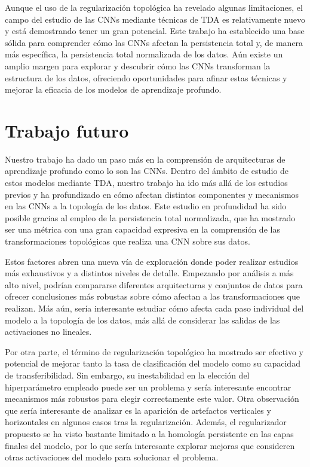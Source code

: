 Aunque el uso de la regularización topológica ha revelado algunas limitaciones,
el campo del estudio de las CNNs mediante técnicas de TDA es relativamente nuevo
y está demostrando tener un gran potencial. Este trabajo ha establecido una base
sólida para comprender cómo las CNNs afectan la persistencia total y, de manera
más específica, la persistencia total normalizada de los datos. Aún existe un
amplio margen para explorar y descubrir cómo las CNNs transforman la estructura
de los datos, ofreciendo oportunidades para afinar estas técnicas y mejorar la eficacia
de los modelos de aprendizaje profundo.

\chapter{Trabajo futuro}

Nuestro trabajo ha dado un paso más en la comprensión de arquitecturas de aprendizaje
profundo como lo son las CNNs. Dentro del ámbito de estudio de estos modelos
mediante TDA, nuestro trabajo ha ido más allá de los estudios previos y ha profundizado
en cómo afectan distintos componentes y mecanismos en las CNNs a la topología de
los datos. Este estudio en profundidad ha sido posible gracias al empleo de la
persistencia total normalizada, que ha mostrado ser una métrica con una gran capacidad
expresiva en la comprensión de las transformaciones topológicas que realiza una CNN
sobre sus datos.

Estos factores abren una nueva vía de exploración donde poder realizar estudios más
exhaustivos y a distintos niveles de detalle. Empezando por análisis a más alto
nivel, podrían compararse diferentes arquitecturas y conjuntos de datos para ofrecer
conclusiones más robustas sobre cómo afectan a las transformaciones que realizan.
Más aún, sería interesante estudiar cómo afecta cada paso individual del modelo a
la topología de los datos, más allá de considerar las salidas de las
activaciones no lineales.

Por otra parte, el término de regularización topológico ha mostrado ser efectivo
y potencial de mejorar tanto la tasa de clasificación del modelo como su capacidad
de transferibilidad. Sin embargo, su inestabilidad en la elección del hiperparámetro
empleado puede ser un problema y sería interesante encontrar mecanismos más robustos
para elegir correctamente este valor. Otra observación que sería interesante de
analizar es la aparición de artefactos verticales y horizontales en algunos
casos tras la regularización. Además, el regularizador propuesto se ha visto
bastante limitado a la homología persistente en las capas finales del modelo, por
lo que sería interesante explorar mejoras que consideren otras activaciones del modelo
para solucionar el problema.

